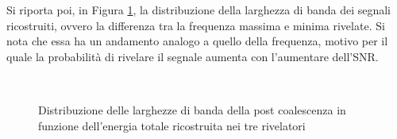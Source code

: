 Si riporta poi, in Figura \ref{fig:bandwidth_pm_Distrib}, la distribuzione della larghezza di banda dei segnali ricostruiti, ovvero la differenza tra la frequenza massima e minima rivelate. Si nota che essa ha un andamento analogo a quello della frequenza, motivo per il quale la probabilità di rivelare il segnale aumenta con l'aumentare dell'SNR.
\begin{figure}[ht]
	\centering
	\\
	\caption{Distribuzione delle larghezze di banda della post coalescenza in funzione dell'energia totale ricostruita nei tre rivelatori}
	\label{fig:bandwidth_pm_Distrib}
\end{figure}

